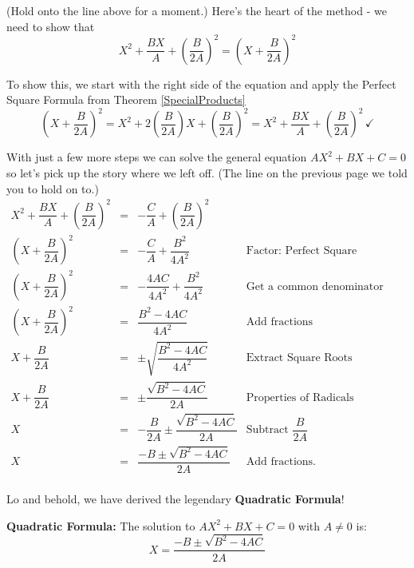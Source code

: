 \documentclass[10pt]{article}
\begin{document}
(Hold onto the line above for a moment.)  Here's the heart of the method - we need to show that \[ X^2 + \dfrac{BX}{A} + \left(\dfrac{B}{2A}\right)^2 = \left(X + \dfrac{B}{2A}\right)^2 \]

To show this, we start with the right side of the equation and apply the Perfect Square Formula from Theorem \ref{SpecialProducts} \[ \left(X + \dfrac{B}{2A}\right)^2 = X^2 + 2\left(\dfrac{B}{2A}\right)X + \left(\dfrac{B}{2A}\right)^2 = X^2 + \dfrac{BX}{A} + \left(\dfrac{B}{2A}\right)^2 \, \checkmark \]

With just a few more steps we can solve the general equation $AX^{2} + BX + C = 0$ so let's pick up the story where we left off. (The line on the previous page we told you to hold on to.)\[ \begin{array}{rclr}

X^2 + \dfrac{BX}{A} + \left(\dfrac{B}{2A}\right)^2 & = & -\dfrac{C}{A} + \left(\dfrac{B}{2A}\right)^2 & \\ [8pt]
\left(X + \dfrac{B}{2A}\right)^2 & = & -\dfrac{C}{A} + \dfrac{B^2}{4A^2} & \text{Factor: Perfect Square Trinomial} \\ [3pt]

\left(X + \dfrac{B}{2A}\right)^2 & = & -\dfrac{4AC}{4A^2} + \dfrac{B^2}{4A^2} & \text{Get a common denominator}\\

\left(X + \dfrac{B}{2A}\right)^2 & = & \dfrac{B^2 - 4AC}{4A^2} & \text{Add fractions}\\ [5pt]

X + \dfrac{B}{2A} & = & \pm \sqrt{\dfrac{B^2 - 4AC}{4A^2}} & \text{Extract Square Roots} \\ [8pt]

X + \dfrac{B}{2A} & = & \pm \dfrac{\sqrt{B^2 - 4AC}}{2A} & \text{Properties of Radicals} \\ [8pt]

X  & = & - \dfrac{B}{2A} \pm \dfrac{\sqrt{B^2 - 4AC}}{2A} & \text{Subtract $\dfrac{B}{2A}$} \\ [8pt]

X  & = & \dfrac{-B \pm \sqrt{B^2 - 4AC}}{2A} & \text{Add fractions.} \\

\end{array}\]

Lo and behold, we have derived the legendary \textbf{Quadratic Formula}!

\medskip

\colorbox{ResultColor}{\bbm

\begin{thm}\label{quadraticformula0}  \textbf{Quadratic Formula:} The solution to $AX^2 + BX + C = 0$ with $A \neq 0$ is: \[X  = \dfrac{-B \pm \sqrt{B^2 - 4AC}}{2A} \]

\end{thm}

\ebm}
\end{document}
